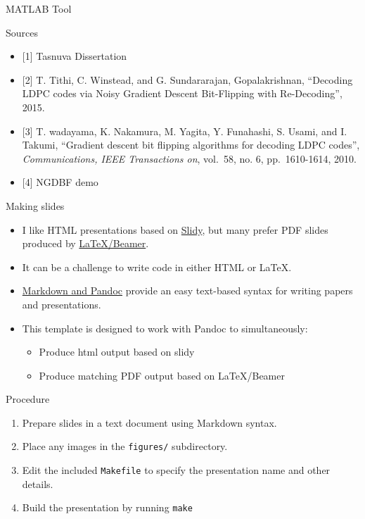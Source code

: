 \documentclass[10pt,ignorenonframetext,]{beamer}
\providecommand{\tightlist}{%
  \setlength{\itemsep}{0pt}\setlength{\parskip}{0pt}}
\begin{document}
\begin{frame}{MATLAB Tool}
\protect\hypertarget{matlab-tool}{}
\end{frame}

\begin{frame}{Sources}
\protect\hypertarget{sources}{}
\begin{itemize}[<+->]
\tightlist
\item
  {[}1{]} Tasnuva Dissertation
\item
  {[}2{]} T. Tithi, C. Winstead, and G. Sundararajan, Gopalakrishnan,
  ``Decoding LDPC codes via Noisy Gradient Descent Bit-Flipping with
  Re-Decoding'', 2015.
\item
  {[}3{]} T. wadayama, K. Nakamura, M. Yagita, Y. Funahashi, S. Usami,
  and I. Takumi, ``Gradient descent bit flipping algorithms for decoding
  LDPC codes'', \emph{Communications, IEEE Transactions on}, vol.~58,
  no. 6, pp.~1610-1614, 2010.
\item
  {[}4{]} NGDBF demo
\end{itemize}
\end{frame}

\begin{frame}{Making slides}
\protect\hypertarget{making-slides}{}
\begin{itemize}[<+->]
\item
  I like HTML presentations based on
  \href{https://www.w3.org/Talks/Tools/Slidy2/Overview.html}{Slidy}, but
  many prefer PDF slides produced by
  \href{https://www.ctan.org/pkg/beamer}{\LaTeX/Beamer}.
\item
  It can be a challenge to write code in either HTML or \LaTeX.
\item
  \href{}{Markdown and Pandoc} provide an easy text-based syntax for
  writing papers and presentations.\\
\item
  This template is designed to work with Pandoc to simultaneously:

  \begin{itemize}[<+->]
  \tightlist
  \item
    Produce html output based on slidy
  \item
    Produce matching PDF output based on \LaTeX/Beamer
  \end{itemize}
\end{itemize}
\end{frame}

\begin{frame}[fragile]{Procedure}
\protect\hypertarget{procedure}{}
\begin{enumerate}[<+->]
\tightlist
\item
  Prepare slides in a text document using Markdown syntax.
\item
  Place any images in the \texttt{figures/} subdirectory.
\item
  Edit the included \texttt{Makefile} to specify the presentation name
  and other details.
\item
  Build the presentation by running \texttt{make}
\end{enumerate}
\end{frame}
\end{document}
